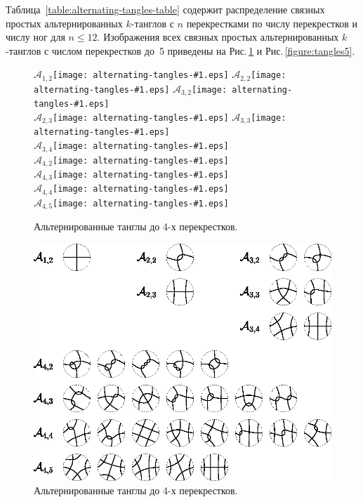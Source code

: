 \documentclass[12pt]{article}
\theoremstyle{plain}
\theoremstyle{definition}
\def\figureref#1{Рис.\,\protect\ref{#1}}
\begin{document}
		Таблица~\ref{table:alternating-tangles-table} содержит распределение связных простых альтернированных $k$-танглов с $n$
		перекрестками по числу перекрестков и числу ног для $n \le 12$. Изображения всех связных простых альтернированных $k$-танглов
		с числом перекрестков до~5 приведены на \figureref{figure:tangles14} и \figureref{figure:tangles5}.

		\begin{figure}[ht]
			\centering
			\def\pic#1{\hbox{\protect\texttt{[image: alternating-tangles-\#1.eps]}}}
			$\mathcal A_{1,2}$\pic{12} \qquad $\mathcal A_{2,2}$\pic{22} \qquad $\mathcal A_{3,2}$\pic{32} \\
			                                  $\mathcal A_{2,3}$\pic{23} \qquad $\mathcal A_{3,3}$\pic{33} \\
			                                                                    $\mathcal A_{3,4}$\pic{34} \\
			$\mathcal A_{4,2}$\pic{42} \\
			$\mathcal A_{4,3}$\pic{43} \\
			$\mathcal A_{4,4}$\pic{44} \\
			$\mathcal A_{4,5}$\pic{45}
			\caption{\footnotesize Альтернированные танглы до 4-х перекрестков.}
		\end{figure}

		\begin{figure}[ht]
			\centering
			\includegraphics[scale=0.8]{c/alternating-tangles-1-4.eps}
			\caption{\footnotesize Альтернированные танглы до 4-х перекрестков.\label{figure:tangles14}}
		\end{figure}
\end{document}
